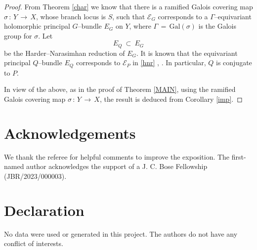 \documentclass[12pt, reqno]{amsart}
\numberwithin{equation}{section}
\begin{document}
\begin{proof}
{}From Theorem \ref{char} we know that there is a ramified Galois covering map
$\sigma\,:\, Y\,\longrightarrow\, X$, whose branch locus is $S$, such that $\mathcal{E}_{G}$ corresponds to a
$\Gamma$--equivariant holomorphic principal $G$--bundle $E_G$ on $Y$, where $\Gamma\,=\, \text{Gal}(\sigma)$
is the Galois group for $\sigma$. Let
$$
E_Q\ \subset\ E_G
$$
be the Harder--Narasimhan reduction of $E_G$. It is known that the equivariant principal $Q$--bundle $E_Q$
corresponds to $\mathcal{E}_P$ in \eqref{hnr} \cite[Proposition 4.1]{BBN1}, \cite[Theorem 3.14]{BBN2}. In
particular, $Q$ is conjugate to $P$.

In view of the above, as in the proof of Theorem \ref{MAIN}, using the ramified Galois covering map
$\sigma\,:\, Y\,\longrightarrow\, X$, the result is deduced from Corollary \ref{imp}. 
\end{proof}

\section*{Acknowledgements}
We thank the referee for helpful comments to improve the exposition.
The first-named author acknowledges the support of a J. C. Bose Fellowship (JBR/2023/000003).

\section*{Declaration}
No data were used or generated in this project. The authors do not have any conflict of interests.
\end{document}
